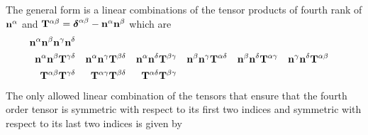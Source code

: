 \documentclass[b5paper,openright,11pt]{book}
\begin{document}
\begin{appendices}
The general  form  is  a linear  combinations  of the  tensor
products      of     fourth      rank     of      ${\bf     n}^\alpha$
and ${\bf T}^{\alpha\beta}=\boldsymbol{\delta}^{\alpha\beta}-{\bf n}^{\alpha}{\bf n}^{\beta}$ which are
\begin{align}
 {\bf n}^\alpha  {\bf n}^\beta   {\bf n}^\gamma   {\bf n}^\delta && && && && && &&
\nonumber\\
{\bf n}^\alpha  {\bf n}^\beta {\bf T}^{\gamma\delta} &&  
{\bf n}^\alpha  {\bf n}^\gamma {\bf T}^{\beta\delta} &&
{\bf n}^\alpha  {\bf n}^\delta {\bf T}^{\beta\gamma} &&
{\bf n}^\beta  {\bf n}^\gamma {\bf T}^{\alpha\delta} &&  
{\bf n}^\beta  {\bf n}^\delta {\bf T}^{\alpha\gamma} &&
{\bf n}^\gamma  {\bf n}^\delta {\bf T}^{\alpha\beta} &&
\nonumber\\
{\bf T}^{\alpha\beta}{\bf T}^{\gamma\delta}&&
{\bf T}^{\alpha\gamma}{\bf T}^{\beta\delta}&&
{\bf T}^{\alpha\delta}{\bf T}^{\beta\gamma}&& && && &&
\end{align}
The only  allowed linear combination  of the tensors that  ensure that
the fourth  order tensor is  symmetric with  respect to its  first two
indices and symmetric with respect to its last two indices is given by


\end{appendices}
\end{document}
